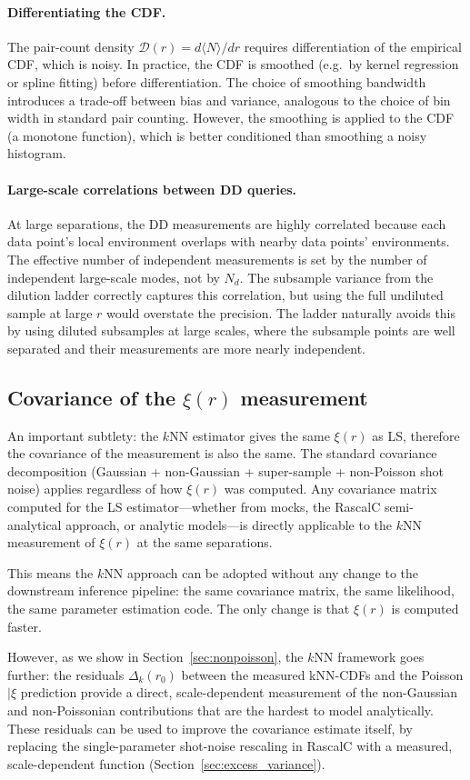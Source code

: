 \paragraph{Differentiating the CDF.}  The pair-count density $\mathcal{D}(r) = d\langle N\rangle / dr$ requires differentiation of the empirical CDF, which is noisy.  In practice, the CDF is smoothed (e.g.\ by kernel regression or spline fitting) before differentiation.  The choice of smoothing bandwidth introduces a trade-off between bias and variance, analogous to the choice of bin width in standard pair counting.  However, the smoothing is applied to the CDF (a monotone function), which is better conditioned than smoothing a noisy histogram.

\paragraph{Large-scale correlations between DD queries.}  At large separations, the DD measurements are highly correlated because each data point's local environment overlaps with nearby data points' environments.  The effective number of independent measurements is set by the number of independent large-scale modes, not by $N_d$.  The subsample variance from the dilution ladder correctly captures this correlation, but using the full undiluted sample at large $r$ would overstate the precision.  The ladder naturally avoids this by using diluted subsamples at large scales, where the subsample points are well separated and their measurements are more nearly independent.

\subsection{Covariance of the $\xi(r)$ measurement}
\label{sec:xi_covariance}

An important subtlety: the $k$NN estimator gives the same $\xi(r)$ as LS, therefore the covariance of the measurement is also the same.  The standard covariance decomposition (Gaussian + non-Gaussian + super-sample + non-Poisson shot noise) applies regardless of how $\xi(r)$ was computed.  Any covariance matrix computed for the LS estimator---whether from mocks, the RascalC semi-analytical approach, or analytic models---is directly applicable to the $k$NN measurement of $\xi(r)$ at the same separations.

This means the $k$NN approach can be adopted without any change to the downstream inference pipeline: the same covariance matrix, the same likelihood, the same parameter estimation code.  The only change is that $\xi(r)$ is computed faster.

However, as we show in Section~\ref{sec:nonpoisson}, the $k$NN framework goes further: the residuals $\Delta_k(r_0)$ between the measured kNN-CDFs and the Poisson$|\xi$ prediction provide a direct, scale-dependent measurement of the non-Gaussian and non-Poissonian contributions that are the hardest to model analytically.  These residuals can be used to improve the covariance estimate itself, by replacing the single-parameter shot-noise rescaling in RascalC with a measured, scale-dependent function (Section~\ref{sec:excess_variance}).

